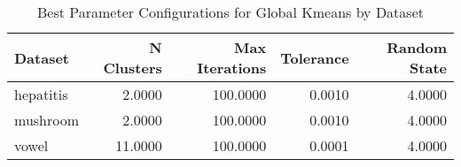 \begin{table*}[ht!]
\caption{Best Parameter Configurations for Global Kmeans by Dataset}
\label{tab:best_configs_global_kmeans_config}
\begin{tabular}{lrrrr}
Dataset & N Clusters & Max Iterations & Tolerance & Random State \\\midrule

hepatitis & 2.0000 & 100.0000 & 0.0010 & 4.0000 \\
mushroom & 2.0000 & 100.0000 & 0.0010 & 4.0000 \\
vowel & 11.0000 & 100.0000 & 0.0001 & 4.0000 \\
\end{tabular}
\end{table*}

